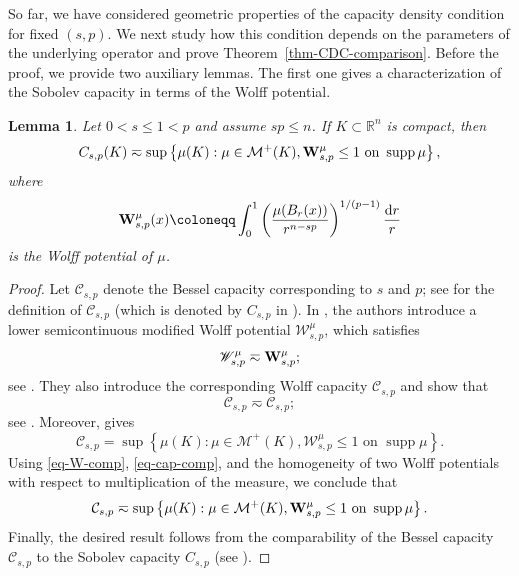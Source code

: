 \documentclass[11pt]{amsart}
\theoremstyle{plain}
\newtheorem{lemma}[theorem]{Lemma}
\theoremstyle{definition}
\numberwithin{equation}{section}
\DeclareMathOperator*{\supp}{supp}
\begin{document}
So far, we have considered geometric properties of the capacity density condition for fixed $(s,p)$. We next study how this condition depends on the parameters of the underlying operator and prove Theorem~\ref{thm-CDC-comparison}. Before the proof, we provide two auxiliary lemmas. The first one gives a characterization of the Sobolev capacity in terms of the Wolff potential.


\begin{lemma}\label{lem-dual-cap}
Let $0<s\leq 1<p$ and assume $sp \leq n$. If $K \subset \mathbb{R}^n$ is compact, then
\begin{equation*}
C_{s, p}(K) \eqsim \sup \left\{ \mu(K): \mu \in \mathcal{M}^+(K), {\bf W}^\mu_{s, p} \leq 1 \text{ on }\supp{\mu} \right\},
\end{equation*}
where
\begin{equation*}
{\bf W}^\mu_{s, p}(x) \coloneqq \int_0^1 \left( \frac{\mu(B_r(x))}{r^{n-sp}} \right)^{1/(p-1)} \frac{\mathrm{d}r}{r}
\end{equation*}
is the Wolff potential of $\mu$.
\end{lemma}

\begin{proof}
Let $\mathcal{C}_{s, p}$ denote the Bessel capacity corresponding to $s$ and $p$; see \cite[Definition~2.2.6]{AH96} for the definition of $\mathcal{C}_{s, p}$ (which is denoted by $C_{s, p}$ in \cite{AH96}). In \cite[Section~4]{HW83}, the authors introduce a lower semicontinuous modified Wolff potential $\mathscr{W}^\mu_{s, p}$, which satisfies
\begin{equation}\label{eq-W-comp}
\mathscr{W}^\mu_{s, p} \eqsim {\bf W}^\mu_{s, p};
\end{equation}
see \cite[p.~175]{HW83}. They also introduce the corresponding Wolff capacity $\mathscr{C}_{s, p}$ and show that
\begin{equation}\label{eq-cap-comp}
\mathscr{C}_{s, p} \eqsim \mathcal{C}_{s, p};
\end{equation}
see \cite[p.~176]{HW83}. Moreover, \cite[Proposition~5]{HW83} gives
\begin{equation*}
\mathscr{C}_{s, p} = \sup \left\{ \mu(K): \mu \in \mathcal{M}^+(K), \mathscr{W}^\mu_{s, p} \leq 1 \text{ on }\supp{\mu} \right\}.
\end{equation*}
Using \eqref{eq-W-comp}, \eqref{eq-cap-comp}, and the homogeneity of two Wolff potentials with respect to multiplication of the measure, we conclude that
\begin{equation*}
\mathcal{C}_{s, p} \eqsim \sup \left\{ \mu(K): \mu \in \mathcal{M}^+(K), {\bf W}^\mu_{s, p} \leq 1 \text{ on }\supp{\mu} \right\}.
\end{equation*}
Finally, the desired result follows from the comparability of the Bessel capacity $\mathcal{C}_{s, p}$ to the Sobolev capacity $C_{s, p}$ (see \cite[Remark~8.2]{BBK25}).
\end{proof}
\end{document}
